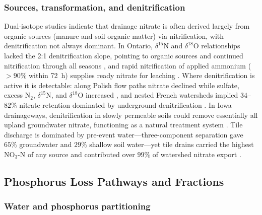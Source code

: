 \documentclass[11pt]{article}
\begin{document}
\subsubsection{Sources, transformation, and denitrification}

Dual-isotope studies indicate that drainage nitrate is often derived largely
from organic sources (manure and soil organic matter) via nitrification,
with denitrification not always dominant. In Ontario, $\delta^{15}$N and
$\delta^{18}$O relationships lacked the 2:1 denitrification slope, pointing
to organic sources and continued nitrification through all seasons
\parencite{Smith2011,Smith2011b}, and rapid nitrification of applied
ammonium ($>90\%$ within 72~h) supplies ready nitrate for leaching
\parencite{Hu2024}. Where denitrification is active it is detectable:
along Polish flow paths nitrate declined while sulfate, excess N$_2$,
$\delta^{15}$N, and $\delta^{18}$O increased \parencite{Dragon2016}, and
nested French watersheds implied $34$--$82\%$ nitrate retention dominated by
underground denitrification \parencite{Billy2011,Billy2013}. In Iowa
drainageways, denitrification in slowly permeable soils could remove
essentially all upland groundwater nitrate, functioning as a natural
treatment system \parencite{Schilling2007,Cambardella1999}. Tile discharge
is dominated by pre-event water---three-component separation gave $65\%$
groundwater and $29\%$ shallow soil water---yet tile drains carried the
highest NO$_3$-N of any source and contributed over $99\%$ of watershed
nitrate export \parencite{Williams2022,Grose2022}.

\subsection{Phosphorus Loss Pathways and Fractions}

\subsubsection{Water and phosphorus partitioning}
\end{document}
